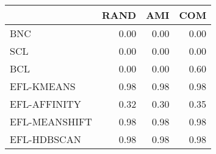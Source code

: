 \begin{tabular}{lrrr}
\toprule
 & RAND & AMI & COM \\
\midrule
BNC & 0.00 & 0.00 & 0.00 \\
SCL & 0.00 & 0.00 & 0.00 \\
BCL & 0.00 & 0.00 & 0.60 \\
EFL-KMEANS & 0.98 & 0.98 & 0.98 \\
EFL-AFFINITY & 0.32 & 0.30 & 0.35 \\
EFL-MEANSHIFT & 0.98 & 0.98 & 0.98 \\
EFL-HDBSCAN & 0.98 & 0.98 & 0.98 \\
\bottomrule
\end{tabular}
